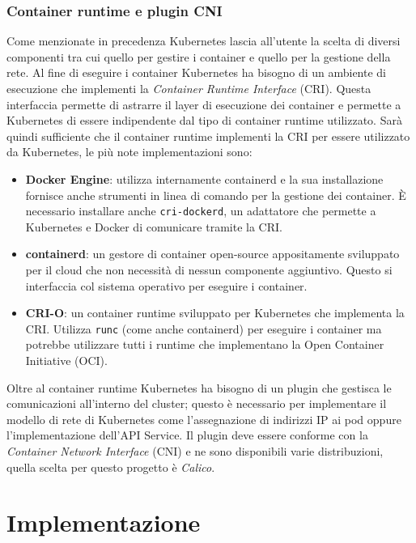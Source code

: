 \documentclass[12pt,a4paper,openright,twoside]{book}
\begin{document}
\subsection{Container runtime e plugin CNI}
%
%
Come menzionate in precedenza Kubernetes lascia all'utente la scelta di diversi componenti tra cui quello per gestire i container e quello per la gestione della rete\cite{kubernetes}.
Al fine di eseguire i container Kubernetes ha bisogno di un ambiente di esecuzione che implementi la \textit{Container Runtime Interface} (CRI).
Questa interfaccia permette di astrarre il layer di esecuzione dei container e permette a Kubernetes di essere indipendente dal tipo di container runtime utilizzato. 
Sarà quindi sufficiente che il container runtime implementi la CRI per essere utilizzato da Kubernetes, le più note implementazioni sono:
\begin{itemize}
    \item \textbf{Docker Engine}: utilizza internamente containerd e la sua installazione fornisce anche strumenti in linea di comando per la gestione dei container. 
        È necessario installare anche \texttt{cri-dockerd}, un adattatore che permette a Kubernetes e Docker di comunicare tramite la CRI.
    \item \textbf{containerd}: un gestore di container open-source appositamente sviluppato per il cloud che non necessità di nessun componente aggiuntivo. 
        Questo si interfaccia col sistema operativo per eseguire i container.
    \item \textbf{CRI-O}: un container runtime sviluppato per Kubernetes che implementa la CRI. Utilizza \texttt{runc} (come anche containerd) per eseguire i container ma potrebbe utilizzare
        tutti i runtime che implementano la Open Container Initiative (OCI).
\end{itemize}
Oltre al container runtime Kubernetes ha bisogno di un plugin che gestisca le comunicazioni all'interno del cluster; questo è
necessario per implementare il modello di rete di Kubernetes come l'assegnazione di indirizzi IP ai pod oppure l'implementazione dell'API Service.
Il plugin deve essere conforme con la \textit{Container Network Interface} (CNI) e ne sono disponibili varie distribuzioni, quella scelta per questo progetto è
\textit{Calico}.
%
\chapter{Implementazione}
\end{document}
